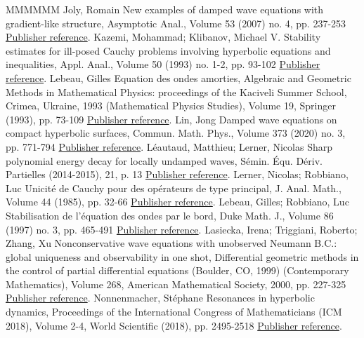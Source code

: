\begin{thebibliography}{MMMMMM}
 Joly, Romain New examples of damped wave equations with gradient-like structure, Asymptotic Anal., Volume 53 (2007) no. 4, pp. 237-253 \href{https://ahl.centre-mersenne.org/item/AHL_2020__3__1241_0/#RJ}{Publisher reference}.
 Kazemi, Mohammad; Klibanov, Michael V. Stability estimates for ill-posed Cauchy problems involving hyperbolic equations and inequalities, Appl. Anal., Volume 50 (1993) no. 1-2, pp. 93-102 \href{https://ahl.centre-mersenne.org/item/AHL_2020__3__1241_0/#K-K}{Publisher reference}.
 Lebeau, Gilles Equation des ondes amorties, Algebraic and Geometric Methods in Mathematical Physics: proceedings of the Kaciveli Summer School, Crimea, Ukraine, 1993 (Mathematical Physics Studies), Volume 19, Springer (1993), pp. 73-109 \href{https://ahl.centre-mersenne.org/item/AHL_2020__3__1241_0/#Lebeau}{Publisher reference}.
 Lin, Jong Damped wave equations on compact hyperbolic surfaces, Commun. Math. Phys., Volume 373 (2020) no. 3, pp. 771-794 \href{https://ahl.centre-mersenne.org/item/AHL_2020__3__1241_0/#Lin}{Publisher reference}.
 Léautaud, Matthieu; Lerner, Nicolas Sharp polynomial energy decay for locally undamped waves, Sémin. Équ. Dériv. Partielles (2014-2015), 21, p. 13 \href{https://ahl.centre-mersenne.org/item/AHL_2020__3__1241_0/#Leautaud-Lerner}{Publisher reference}.
 Lerner, Nicolas; Robbiano, Luc Unicité de Cauchy pour des opérateurs de type principal, J. Anal. Math., Volume 44 (1985), pp. 32-66 \href{https://ahl.centre-mersenne.org/item/AHL_2020__3__1241_0/#LR}{Publisher reference}.
 Lebeau, Gilles; Robbiano, Luc Stabilisation de l’équation des ondes par le bord, Duke Math. J., Volume 86 (1997) no. 3, pp. 465-491 \href{https://ahl.centre-mersenne.org/item/AHL_2020__3__1241_0/#Lebeau-Robbiano}{Publisher reference}.
 Lasiecka, Irena; Triggiani, Roberto; Zhang, Xu Nonconservative wave equations with unobserved Neumann B.C.: global uniqueness and observability in one shot, Differential geometric methods in the control of partial differential equations (Boulder, CO, 1999) (Contemporary Mathematics), Volume 268, American Mathematical Society, 2000, pp. 227-325 \href{https://ahl.centre-mersenne.org/item/AHL_2020__3__1241_0/#Las-Tri-Zha}{Publisher reference}.
 Nonnenmacher, Stéphane Resonances in hyperbolic dynamics, Proceedings of the International Congress of Mathematicians (ICM 2018), Volume 2-4, World Scientific (2018), pp. 2495-2518 \href{https://ahl.centre-mersenne.org/item/AHL_2020__3__1241_0/#NonenmacherICM}{Publisher reference}.

\end{thebibliography}
